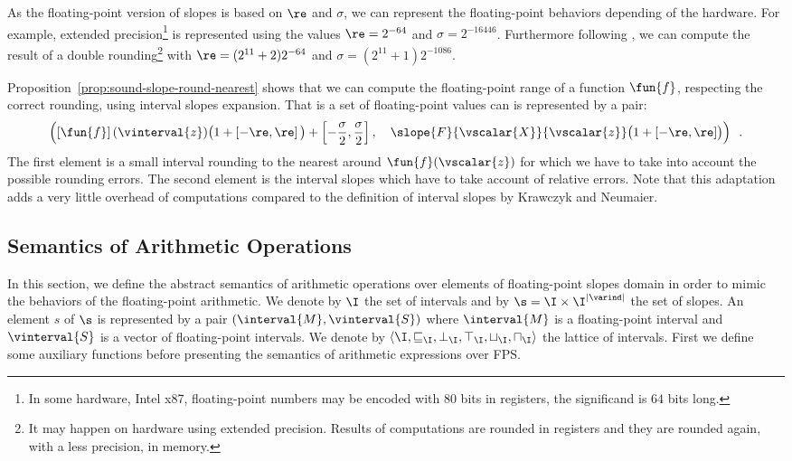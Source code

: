 \begin{remark}
  As the floating-point version of slopes is based on $\re$ and
  $\sigma$, we can represent the floating-point behaviors depending of
  the hardware. For example, extended precision\footnote{In some
    hardware, \eg Intel x87, floating-point numbers may be encoded
    with $80$ bits in registers, \ie the significand is $64$ bits
    long.} is represented using the values $\re=2^{-64}$ and
  $\sigma=2^{-16446}$. Furthermore following \cite{BN10}, we can
  compute the result of a double rounding\footnote{It may happen on
    hardware using extended precision. Results of computations are
    rounded in registers and they are rounded again, with a less
    precision, in memory.}  with $\re=(2^{11}+2)2^{-64}$ and
  $\sigma=(2^{11}+1)2^{-1086}$. \end{remark}

Proposition~\ref{prop:sound-slope-round-nearest} shows that we can
compute the floating-point range of a function $\fun{f}$, respecting
the correct rounding, using interval slopes expansion. That is a set
of floating-point values can is represented by a pair:{\small
  \begin{displaymath}
    \left(
      \left[\fun{f}\right](\vinterval{z})
      \big(1 + \left[-\re,\re\right]\big) + 
      \left[-\frac{\sigma}{2}, \frac{\sigma}{2}\right],
      \quad
      \slope{F}{\vscalar{X}}{\vscalar{z}}\big(1+[-\re,\re]\big)
    \right)
    \enspace.
  \end{displaymath}
}The first element is a small interval rounding to the nearest around
$\fun{f}(\vscalar{z})$ for which we have to take into account the
possible rounding errors. The second element is the interval slopes
which have to take account of relative errors. Note that this
adaptation adds a very little overhead of computations compared to the
definition of interval slopes by Krawczyk and Neumaier.

\subsection{Semantics of Arithmetic Operations}
\label{sec:arithmetic-operations}

In this section, we define the abstract semantics of arithmetic
operations over elements of floating-point slopes domain in order to
mimic the behaviors of the floating-point arithmetic. We denote by
$\I$ the set of intervals and by $\s = \I \times \I^{|\varind|}$ the
set of slopes. An element $s$ of $\s$ is represented by a pair
$(\interval{M}, \vinterval{S})$ where $\interval{M}$ is a
floating-point interval and $\vinterval{S}$ is a vector of
floating-point intervals. We denote by $\langle \I, \sqsubseteq_\I,
\bot_\I, \top_\I, \sqcup_\I, \sqcap_\I \rangle$ the lattice of
intervals. First we define some auxiliary functions before presenting
the semantics of arithmetic expressions over \textsf{FPS}.

